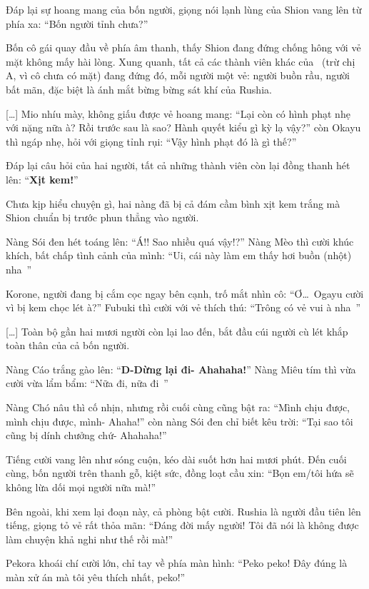 \documentclass[../main.tex]{subfiles}
\begin{document}
Đáp lại sự hoang mang của bốn người, giọng nói lạnh lùng của Shion vang lên từ phía xa: ``Bốn người tỉnh chưa?''

Bốn cô gái quay đầu về phía âm thanh, thấy Shion đang đứng chống hông với vẻ mặt không mấy hài lòng. Xung quanh, tất cả các thành viên khác của \hll\ (trừ chị A, vì cô chưa có mặt) đang đứng đó, mỗi người một vẻ: người buồn rầu, người bất mãn, đặc biệt là ánh mắt bừng bừng sát khí của Rushia.

    [\dots] Mio nhíu mày, không giấu được vẻ hoang mang: ``Lại còn có hình phạt nhẹ với nặng nữa à? Rồi trước sau là sao? Hành quyết kiểu gì kỳ lạ vậy?'' còn Okayu thì ngáp nhẹ, hỏi với giọng tỉnh rụi: ``Vậy hình phạt đó là gì thế?''

Đáp lại câu hỏi của hai người, tất cả những thành viên còn lại đồng thanh hét lên: ``\textbf{Xịt kem!}''

Chưa kịp hiểu chuyện gì, hai nàng đã bị cả đám cầm bình xịt kem trắng mà Shion chuẩn bị trước phun thẳng vào người.

Nàng Sói đen hét toáng lên: ``Á!! Sao nhiều quá vậy!?'' Nàng Mèo thì cười khúc khích, bất chấp tình cảnh của mình: ``Ui, cái này làm em thấy hơi buồn (nhột) nha~''

Korone, người đang bị cắm cọc ngay bên cạnh, trố mắt nhìn cô: ``Ơ\dots\ Ogayu cười vì bị kem chọc lét à?'' Fubuki thì cười với vẻ thích thú: ``Trông có vẻ vui à nha~''

[\dots] Toàn bộ gần hai mươi người còn lại lao đến, bắt đầu cúi người cù lét khắp toàn thân của cả bốn người.

Nàng Cáo trắng gào lên: ``\textbf{D-Dừng lại đi- Ahahaha!}'' Nàng Miêu tím thì vừa cười vừa lẩm bẩm: ``Nữa đi, nữa đi~''

Nàng Chó nâu thì cố nhịn, nhưng rồi cuối cùng cũng bật ra: ``Mình chịu được, mình chịu được, mình- Ahaha!'' còn nàng Sói đen chỉ biết kêu trời: ``Tại sao tôi cũng bị dính chưởng chứ- Ahahaha!''

Tiếng cười vang lên như sóng cuộn, kéo dài suốt hơn hai mươi phút. Đến cuối cùng, bốn người trên thanh gỗ, kiệt sức, đồng loạt cầu xin: ``Bọn em/tôi hứa sẽ không lừa dối mọi người nữa mà!''

\il

Bên ngoài, khi xem lại đoạn này, cả phòng bật cười. Rushia là người đầu tiên lên tiếng, giọng tỏ vẻ rất thỏa mãn: ``Đáng đời mấy người! Tôi đã nói là không được làm chuyện khả nghi như thế rồi mà!''

Pekora khoái chí cười lớn, chỉ tay về phía màn hình: ``Peko peko! Đây đúng là màn xử án mà tôi yêu thích nhất, peko!''
\end{document}
